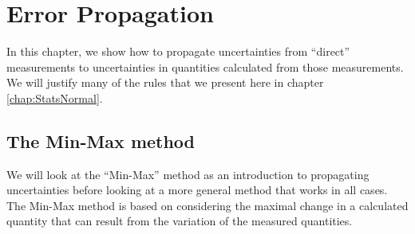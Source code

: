 \chapter{Error Propagation}
\label{chap:ErrorPropagation}
In this chapter, we show how to propagate uncertainties from ``direct'' measurements to uncertainties in quantities calculated from those measurements. We will justify many of the rules that we present here in chapter \ref{chap:StatsNormal}.

\section{The Min-Max method}
We will look at the ``Min-Max'' method as an introduction to propagating uncertainties before looking at a more general method that works in all cases. The Min-Max method is based on considering the maximal change in a calculated quantity that can result from the variation of the measured quantities.

